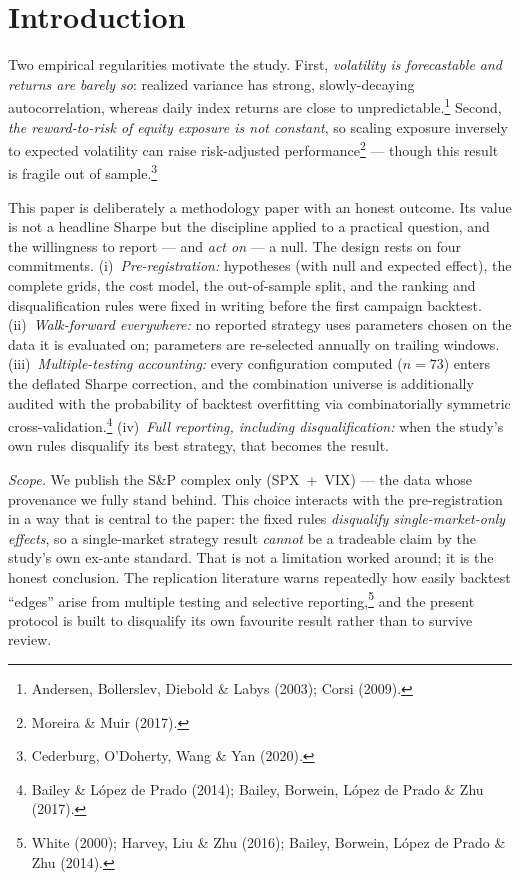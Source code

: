\documentclass[12pt,a4paper]{article}
\newcommand{\cf}[1]{\footnote{#1}}
\begin{document}
\newpage
\setcounter{page}{1}
\setcounter{footnote}{0}
\renewcommand{\thefootnote}{\arabic{footnote}}
\doublespacing

\section{Introduction}

Two empirical regularities motivate the study. First, \emph{volatility is forecastable and returns
are barely so}: realized variance has strong, slowly-decaying autocorrelation, whereas daily index
returns are close to unpredictable.\cf{Andersen, Bollerslev, Diebold \& Labys (2003); Corsi (2009).}
Second, \emph{the reward-to-risk of equity exposure is not constant}, so scaling exposure inversely
to expected volatility can raise risk-adjusted performance\cf{Moreira \& Muir (2017).} --- though
this result is fragile out of sample.\cf{Cederburg, O'Doherty, Wang \& Yan (2020).}

This paper is deliberately a methodology paper with an honest outcome. Its value is not a headline
Sharpe but the discipline applied to a practical question, and the willingness to report --- and
\emph{act on} --- a null. The design rests on four commitments. (i)~\emph{Pre-registration:}
hypotheses (with null and expected effect), the complete grids, the cost model, the out-of-sample
split, and the ranking and disqualification rules were fixed in writing before the first campaign
backtest. (ii)~\emph{Walk-forward everywhere:} no reported strategy uses parameters chosen on the
data it is evaluated on; parameters are re-selected annually on trailing windows. (iii)~\emph{Multiple-testing
accounting:} every configuration computed ($n=73$) enters the deflated Sharpe correction, and the
combination universe is additionally audited with the probability of backtest overfitting via
combinatorially symmetric cross-validation.\cf{Bailey \& L\'opez de Prado (2014); Bailey, Borwein,
L\'opez de Prado \& Zhu (2017).} (iv)~\emph{Full reporting, including disqualification:} when the
study's own rules disqualify its best strategy, that becomes the result.

\emph{Scope.} We publish the S\&P complex only (SPX~+~VIX) --- the data whose provenance we fully
stand behind. This choice interacts with the pre-registration in a way that is central to the paper:
the fixed rules \emph{disqualify single-market-only effects}, so a single-market strategy result
\emph{cannot} be a tradeable claim by the study's own ex-ante standard. That is not a limitation
worked around; it is the honest conclusion. The replication literature warns repeatedly how easily
backtest ``edges'' arise from multiple testing and selective reporting,\cf{White (2000); Harvey, Liu
\& Zhu (2016); Bailey, Borwein, L\'opez de Prado \& Zhu (2014).} and the present protocol is built to
disqualify its own favourite result rather than to survive review.
\end{document}
